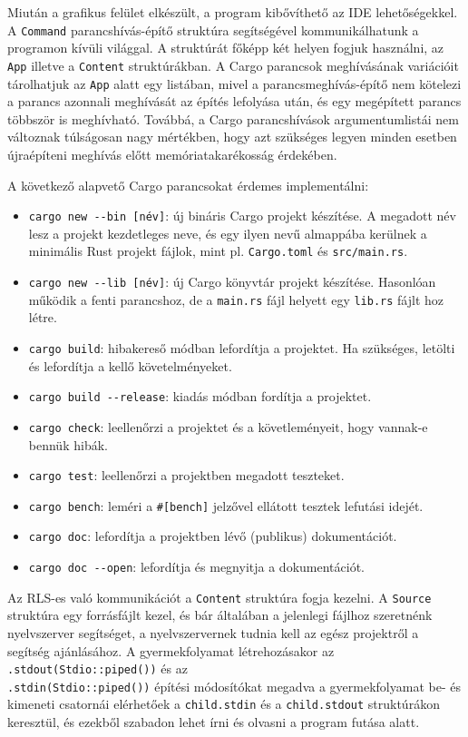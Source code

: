 Miután a grafikus felület elkészült, a program kibővíthető az IDE lehetőségekkel.
A \texttt{Command} parancshívás-építő struktúra segítségével kommunikálhatunk a programon kívüli világgal.
A struktúrát főképp két helyen fogjuk használni, az \texttt{App} illetve a \texttt{Content} struktúrákban.
A Cargo parancsok meghívásának variációit tárolhatjuk az \texttt{App} alatt egy listában,
mivel a parancsmeghívás-építő nem kötelezi a parancs azonnali meghívását az építés lefolyása után,
és egy megépített parancs többször is meghívható.
Továbbá, a Cargo parancshívások argumentumlistái nem változnak túlságosan nagy mértékben,
hogy azt szükséges legyen minden esetben újraépíteni meghívás előtt memóriatakarékosság érdekében.

A következő alapvető Cargo parancsokat érdemes implementálni:

\begin{itemize}
    \item \verb+cargo new --bin [név]+: új bináris Cargo projekt készítése. 
    A megadott név lesz a projekt kezdetleges neve, és egy ilyen nevű almappába kerülnek a minimális Rust projekt fájlok,
    mint pl. \texttt{Cargo.toml} és \texttt{src/main.rs}.
    \item \verb+cargo new --lib [név]+: új Cargo könyvtár projekt készítése.
    Hasonlóan működik a fenti parancshoz, de a \texttt{main.rs} fájl helyett egy \texttt{lib.rs} fájlt hoz létre.
    \item \verb+cargo build+: hibakereső módban lefordítja a projektet.
    Ha szükséges, letölti és lefordítja a kellő követelményeket.
    \item \verb+cargo build --release+: kiadás módban fordítja a projektet.
    \item \verb+cargo check+: leellenőrzi a projektet és a követleményeit, hogy vannak-e bennük hibák.
    \item \verb+cargo test+: leellenőrzi a projektben megadott teszteket.
    \item \verb+cargo bench+: leméri a \verb+#[bench]+ jelzővel ellátott tesztek lefutási idejét.
    \item \verb+cargo doc+: lefordítja a projektben lévő (publikus) dokumentációt.
    \item \verb+cargo doc --open+: lefordítja és megnyitja a dokumentációt.
\end{itemize}

Az RLS-es való kommunikációt a \texttt{Content} struktúra fogja kezelni.
A \texttt{Source} struktúra egy forrásfájlt kezel, és bár általában a jelenlegi fájlhoz szeretnénk
nyelvszerver segítséget, a nyelvszervernek tudnia kell az egész projektről a segítség ajánlásához.
A gyermekfolyamat létrehozásakor az \texttt{.stdout(Stdio::piped())} és az\\ \texttt{.stdin(Stdio::piped())}
építési módosítókat megadva a gyermekfolyamat be- és kimeneti csatornái elérhetőek a \texttt{child.stdin}
és a \texttt{child.stdout} struktúrákon keresztül, és ezekből szabadon lehet írni és olvasni a program futása alatt.

